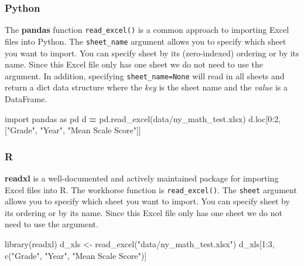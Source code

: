 \documentclass[
]{book}
\newenvironment{Shaded}{\begin{snugshade}}{\end{snugshade}}
\newcommand{\DecValTok}[1]{\textcolor[rgb]{0.00,0.00,0.81}{#1}}
\newcommand{\FunctionTok}[1]{\textcolor[rgb]{0.00,0.00,0.00}{#1}}
\newcommand{\ImportTok}[1]{#1}
\newcommand{\NormalTok}[1]{#1}
\newcommand{\OperatorTok}[1]{\textcolor[rgb]{0.81,0.36,0.00}{\textbf{#1}}}
\newcommand{\OtherTok}[1]{\textcolor[rgb]{0.56,0.35,0.01}{#1}}
\newcommand{\SpecialCharTok}[1]{\textcolor[rgb]{0.00,0.00,0.00}{#1}}
\newcommand{\StringTok}[1]{\textcolor[rgb]{0.31,0.60,0.02}{#1}}
\begin{document}
\hypertarget{python-13}{%
\subsubsection*{Python}\label{python-13}}

The \textbf{pandas} function \texttt{read\_excel()} is a common approach to importing Excel files into Python. The \texttt{sheet\_name} argument allows you to specify which sheet you want to import. You can specify sheet by its (zero-indexed) ordering or by its name. Since this Excel file only has one sheet we do not need to use the argument. In addition, specifying \texttt{sheet\_name=None} will read in all sheets and return a dict data structure where the \emph{key} is the sheet name and the \emph{value} is a DataFrame.

\begin{Shaded}
\begin{Highlighting}[]
\ImportTok{import}\NormalTok{ pandas }\ImportTok{as}\NormalTok{ pd  }
\NormalTok{d }\OperatorTok{=}\NormalTok{ pd.read\_excel(}\StringTok{\textquotesingle{}data/ny\_math\_test.xlsx\textquotesingle{}}\NormalTok{)  }
\NormalTok{d.loc[}\DecValTok{0}\NormalTok{:}\DecValTok{2}\NormalTok{, [}\StringTok{"Grade"}\NormalTok{, }\StringTok{"Year"}\NormalTok{, }\StringTok{"Mean Scale Score"}\NormalTok{]]  }
\end{Highlighting}
\end{Shaded}

\hypertarget{r-13}{%
\subsubsection*{R}\label{r-13}}

\textbf{readxl} is a well-documented and actively maintained package for importing Excel files into R. The workhorse function is \texttt{read\_excel()}. The \texttt{sheet} argument allows you to specify which sheet you want to import. You can specify sheet by its ordering or by its name. Since this Excel file only has one sheet we do not need to use the argument.

\begin{Shaded}
\begin{Highlighting}[]
\FunctionTok{library}\NormalTok{(readxl)}
\NormalTok{d\_xls }\OtherTok{\textless{}{-}} \FunctionTok{read\_excel}\NormalTok{(}\StringTok{"data/ny\_math\_test.xlsx"}\NormalTok{)}
\NormalTok{d\_xls[}\DecValTok{1}\SpecialCharTok{:}\DecValTok{3}\NormalTok{, }\FunctionTok{c}\NormalTok{(}\StringTok{"Grade"}\NormalTok{, }\StringTok{"Year"}\NormalTok{, }\StringTok{"Mean Scale Score"}\NormalTok{)]}
\end{Highlighting}
\end{Shaded}
\end{document}
